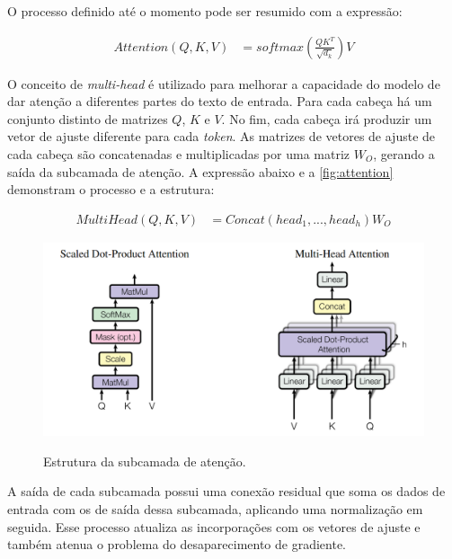 O processo definido até o momento pode ser resumido com a expressão:

\begin{align*}
      Attention(Q, K, V) & = softmax({\frac{QK^T}{\sqrt{d_k}}})V
\end{align*}

O conceito de \textit{multi-head} é utilizado para melhorar a capacidade do modelo de dar atenção a diferentes partes do texto de entrada. Para cada cabeça há um
conjunto distinto de matrizes \begin{math}Q\end{math}, \begin{math}K\end{math} e \begin{math}V\end{math}. No fim, cada cabeça irá produzir um vetor de ajuste diferente
para cada \textit{token}. As matrizes de vetores de ajuste de cada cabeça são concatenadas e multiplicadas por uma matriz \begin{math}W_O\end{math}, gerando a saída da
subcamada de atenção. A expressão abaixo e a \autoref{fig:attention} demonstram o processo e a estrutura:

\begin{align*}
      MultiHead(Q, K, V) & = Concat(head_1,...,head_h)W_O
\end{align*}

\begin{figure}[ht]
      \centering
      \caption{\small Estrutura da subcamada de atenção.}
      \includegraphics[width=0.7\columnwidth,keepaspectratio]{images/attention.png}
      \label{fig:attention}
\end{figure}

A saída de cada subcamada possui uma conexão residual que soma os dados de entrada com os de saída dessa subcamada, aplicando uma normalização em seguida. Esse processo
atualiza as incorporações com os vetores de ajuste e também atenua o problema do desaparecimento de gradiente.


